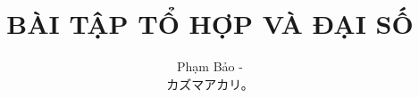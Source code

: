 \documentclass[11pt]{scrartcl}
\begin{document}
\title{\vspace{-2em}\textcolor{bk}{\textbf{BÀI TẬP TỔ HỢP VÀ ĐẠI SỐ}}}

\author{Phạm Bảo -\begin{CJK}{UTF8}{ipxm} カズマアカリ。\end{CJK}\vspace{-1em}}


\thispagestyle{empty}

\tableofcontents
\newpage
\end{document}
